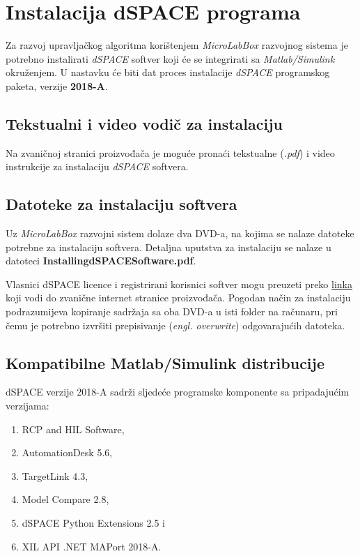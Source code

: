 \chapter{Instalacija dSPACE programa}\label{dSpace}

\qquad Za razvoj upravljačkog algoritma korištenjem \textit{MicroLabBox} razvojnog sistema je potrebno instalirati \textit{dSPACE} softver koji će se integrirati sa \textit{Matlab/Simulink} okruženjem. U nastavku će biti dat proces instalacije \textit{dSPACE} programskog paketa, verzije \textbf{2018-A}.

\section{Tekstualni i video vodič za instalaciju}

\qquad Na zvaničnoj stranici proizvođača je moguće pronaći tekstualne (\textit{.pdf}) \cite{dSPACEinstall} i video \cite{dSPACEvideo} instrukcije za instalaciju \textit{dSPACE} softvera.

\section{Datoteke za instalaciju softvera}\label{folder}

\qquad Uz \textit{MicroLabBox} razvojni sistem dolaze dva DVD-a, na kojima se nalaze datoteke potrebne za instalaciju softvera. Detaljna uputstva za instalaciju se nalaze u datoteci \textbf{InstallingdSPACESoftware.pdf}. 

Vlasnici dSPACE licence i registrirani korisnici softver mogu preuzeti preko \href{https://www.dspace.com/en/pub/home/support/patches/rlsdl.cfm}{linka} koji vodi do zvanične internet stranice proizvođača. Pogodan način za instalaciju podrazumijeva kopiranje sadržaja sa oba DVD-a u isti folder na računaru, pri čemu je potrebno izvršiti prepisivanje (\textit{engl. overwrite}) odgovarajućih datoteka.

\section{Kompatibilne Matlab/Simulink distribucije}

\qquad dSPACE verzije 2018-A sadrži sljedeće programske komponente sa pripadajućim verzijama:

\begin{enumerate}
	\item RCP and HIL Software,
	\item AutomationDesk 5.6,
	\item TargetLink 4.3,
	\item Model Compare 2.8,
	\item dSPACE Python Extensions 2.5 i
	\item XIL API .NET MAPort 2018-A.
\end{enumerate}

